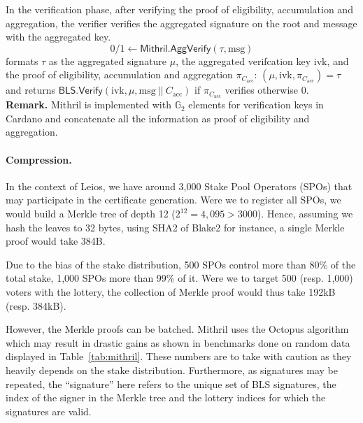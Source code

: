 \documentclass{article}
\newcommand{\G}[1]{\ensuremath{\mathbb{G}_{#1}}\xspace}
\newcommand{\m}{\ensuremath{\textrm{msg}}\xspace}
\newcommand{\acc}{\ensuremath{\textrm{acc}}\xspace}
\newcommand{\ivk}{\ensuremath{\textrm{ivk}}\xspace}
\newcommand{\BLS}{\ensuremath{\mathsf{BLS}}\xspace}
\newcommand{\Mithril}{\ensuremath{\mathsf{Mithril}}\xspace}
\newcommand{\Verify}{\ensuremath{\mathsf{Verify}}\xspace}
\newcommand{\AggVerify}{\ensuremath{\mathsf{AggVerify}}\xspace}
\begin{document}
In the verification phase, after verifying the proof of eligibility, accumulation and aggregation, the verifier verifies the aggregated signature on the root and message with the aggregated key.
$$ 0/1 \leftarrow \Mithril.\AggVerify(\tau, \m)$$
formats $\tau$ as the aggregated signature $\mu$, the aggregated verifcation key \ivk, and the proof of eligibility, accumulation and aggregation $\pi_{C_\acc}$: $(\mu, \ivk, \pi_{C_\acc}) = \tau$ and returns $\BLS.\Verify(\ivk, \mu, \m\ ||\ C_\acc)$ if $\pi_{C_\acc}$ verifies otherwise 0.\\


\noindent\textbf{Remark.} Mithril is implemented with \G{2} elements for verification keys in Cardano and concatenate all the information as proof of eligibility and aggregation.

\paragraph{Compression.} In the context of Leios, we have around 3,000 Stake Pool Operators (SPOs) that may participate in the certificate generation.
Were we to register all SPOs, we would build a Merkle tree of depth 12 ($2^{12}=4,095 > 3000$). Hence, assuming we hash the leaves to 32 bytes, using SHA2 of Blake2 for instance, a single Merkle proof would take 384B.

Due to the bias of the stake distribution, 500 SPOs control more than 80\% of the total stake, 1,000 SPOs more than 99\% of it.
Were we to target 500 (resp. 1,000) voters with the lottery, the collection of Merkle proof would thus take 192kB (resp. 384kB).

However, the Merkle proofs can be batched. Mithril uses the Octopus algorithm~\cite{aumasson2018improving} which may result in drastic gains as shown in benchmarks done on random data displayed in Table~\ref{tab:mithril}. These numbers are to take with caution as they heavily depends on the stake distribution. Furthermore, as signatures may be repeated, the ``signature'' here refers to the unique set of BLS signatures, the index of the signer in the Merkle tree and the lottery indices for which the signatures are valid.
\end{document}
